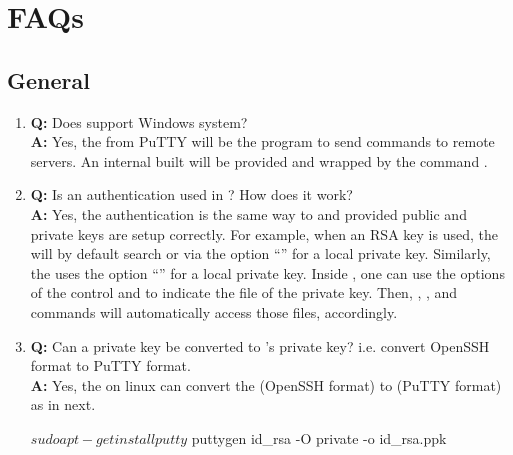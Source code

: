 

\section[FAQs]{FAQs}
\label{sec:faqs}


\subsection[General]{General}
\label{sec:general}

\begin{enumerate}
\item {\bf\color{blue} Q:}
      Does  support Windows system? \\
      {\bf\color{blue} A:}
      Yes, the  from PuTTY will be the program to send
      commands to remote servers. An internal built  will
      be provided and wrapped by the  command .

\item {\bf\color{blue} Q:}
      Is an authentication used in ? How does it work? \\
      {\bf\color{blue} A:}
      Yes, the authentication is the same way to  and
       provided public and private keys are setup correctly.
      For example, when an RSA key is used, the  will by
      default search
       or via the option ``'' for a local
      private key.
      Similarly,
      the  uses the option ``'' for a
      local private key.
      Inside , one can use the options of the control
       and  to
      indicate the file of the private key. Then, , ,
      and  commands will automatically access those files,
      accordingly.

\item {\bf\color{blue} Q:}
      Can a  private key be converted to 's private
      key? i.e. convert OpenSSH format to PuTTY format. \\
      {\bf\color{blue} A:}
      Yes, the  on linux can convert the 
      (OpenSSH format) to  (PuTTY format) as in next.
\begin{Command}
$ sudo apt-get install putty
$ puttygen id_rsa -O private -o id_rsa.ppk
\end{Command}

\end{enumerate}
